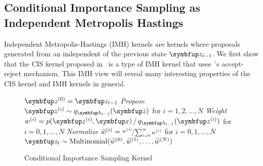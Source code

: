 %
\subsection{Conditional Importance Sampling as Independent Metropolis Hastings}\label{section:cis_imh}
Independent Metropolis-Hastings (IMH) kernels are kernels where proposals generated from an independent of the previous state \(\vz_{t-1}\).
We first show that the CIS kernel proposed in~\citep{NEURIPS2020_b2070693} is a type of IMH kernel that uses~\citet{barker_monte_1965}'s accept-reject mechanism.
This IMH view will reveal many interesting properties of the CIS kernel and IMH kernels in general.


\begin{figure}
  \begin{algorithm2e}[H]
    \DontPrintSemicolon
    \SetAlgoLined
    \(\vz^{(0)} = \vz_{t-1}\) \;
    \textit{Propose} \(\vz^{(i)} \sim q_{\vlambda_{t-1}}(\vz)\) for \(i = 1, 2,\ldots, N\) \;
    \textit{Weight} \(w^{(i)} = p(\vz^{(i)},\vx) \,/\, q_{\vlambda_{t-1}}(\vz^{(i)}) \) for \(i = 0, 1,\ldots, N\)\;
    \textit{Normalize} \(\widetilde{w}^{(i)} = \nicefrac{w^{(i)}}{ \sum^{N}_{i=0} w^{(i)} }\) for \(i = 0, 1,\ldots, N\)\;
    \(\vz_{t} \sim \mathrm{Multinomial}(\widetilde{w}^{(0)}, \widetilde{w}^{(1)}, \ldots, \widetilde{w}^{(N)}) \)\;
    \caption{Conditional Importance Sampling Kernel}\label{alg:cis}
  \end{algorithm2e}
\end{figure}
%
